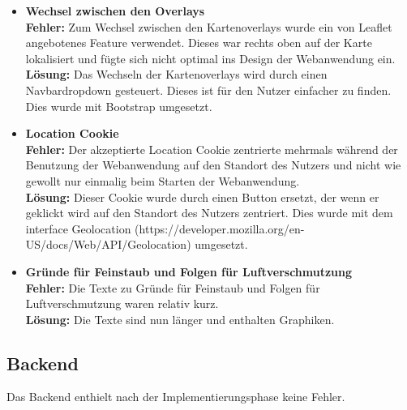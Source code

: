 \begin{itemize}
	\item \textbf{Wechsel zwischen den Overlays}
	\\
	\textbf{Fehler:} Zum Wechsel zwischen den \glspl{Kartenoverlay} wurde ein von \gls{Leaflet} angebotenes Feature verwendet. Dieses war rechts oben auf der Karte lokalisiert und fügte sich nicht optimal ins Design der Webanwendung ein.
	\\
	\textbf{Lösung:} Das Wechseln der \glspl{Kartenoverlay} wird durch einen Navbardropdown gesteuert. Dieses ist für den Nutzer einfacher zu finden. Dies wurde mit \gls{Bootstrap} umgesetzt.
	\item \textbf{Location Cookie}
	\\
	\textbf{Fehler:} Der akzeptierte Location Cookie zentrierte mehrmals während der Benutzung der Webanwendung auf den Standort des Nutzers und nicht wie gewollt nur einmalig beim Starten der Webanwendung.
	\\
	\textbf{Lösung:} Dieser Cookie wurde durch einen Button ersetzt, der wenn er geklickt wird auf den Standort des Nutzers zentriert. Dies wurde mit dem interface Geolocation (https://developer.mozilla.org/en-US/docs/Web/API/Geolocation) umgesetzt.
	\item \textbf{Gründe für Feinstaub und Folgen für Luftverschmutzung}
	\\
	\textbf{Fehler:} Die Texte zu Gr\"unde f\"ur Feinstaub und Folgen für Luftverschmutzung waren relativ kurz.
	\\
	\textbf{Lösung:} Die Texte sind nun länger und enthalten Graphiken.	
\end{itemize}
\subsection{Backend}
Das Backend enthielt nach der Implementierungsphase keine Fehler.